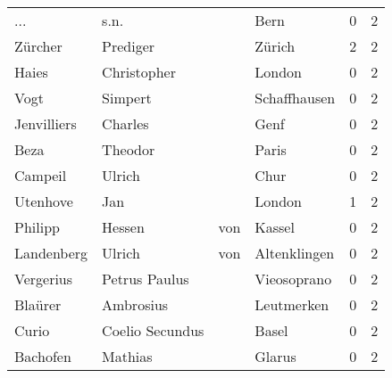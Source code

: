 \documentclass[10pt,a4paper,landscape]{article}
\begin{document}
\begin{longtable}{llllrr}
                      ... &                               s.n. &             &                                        Bern &          0 &         2 \\
                  Zürcher &                           Prediger &             &                                      Zürich &          2 &         2 \\
                    Haies &                        Christopher &             &                                      London &          0 &         2 \\
                     Vogt &                            Simpert &             &                                Schaffhausen &          0 &         2 \\
              Jenvilliers &                            Charles &             &                                        Genf &          0 &         2 \\
                     Beza &                            Theodor &             &                                       Paris &          0 &         2 \\
                  Campeil &                             Ulrich &             &                                        Chur &          0 &         2 \\
                 Utenhove &                                Jan &             &                                      London &          1 &         2 \\
                  Philipp &                             Hessen &         von &                                      Kassel &          0 &         2 \\
               Landenberg &                             Ulrich &         von &                                Altenklingen &          0 &         2 \\
                Vergerius &                      Petrus Paulus &             &                                 Vieosoprano &          0 &         2 \\
                  Blaürer &                          Ambrosius &             &                                  Leutmerken &          0 &         2 \\
                    Curio &                    Coelio Secundus &             &                                       Basel &          0 &         2 \\
                 Bachofen &                            Mathias &             &                                      Glarus &          0 &         2 \\

\end{longtable}
\end{document}
